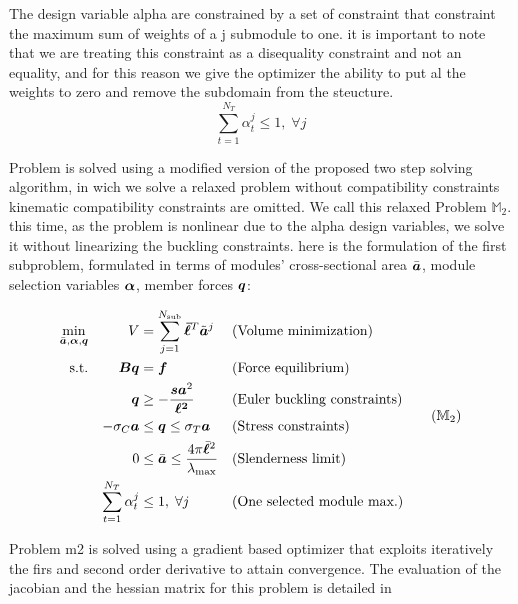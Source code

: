 The design variable alpha are constrained by a set of constraint that constraint the maximum sum of weights of a j submodule to one. it is important to note that we are treating this constraint as a disequality constraint and not an equality, and for this reason we give the optimizer the ability to put al the weights to zero and remove the subdomain from the steucture.
\begin{equation}
    \sum_{t=1}^{N_T} \alpha_t^j \leq 1, \; \forall j 
\end{equation}

Problem  is solved using a modified version of the proposed two step solving algorithm, in wich we solve a relaxed problem without compatibility constraints kinematic compatibility constraints are omitted. We call this relaxed Problem $\mathbb{M}_2$. this time, as the problem is nonlinear due to the alpha design variables, we solve it without linearizing the buckling constraints.  here is the formulation of the first subproblem, formulated in terms of modules' cross-sectional area $\bar{\bm{a}}$, module selection variables $\bm{\alpha}$, member forces $\bm{q}$:

\begin{equation}
    \begin{aligned}
    \min_{\bar{\vect{a}}, \vect{\alpha}, \bm{q}}   && V &= \sum_{j=1}^{N_{\text{sub}}}\vect{\bar{\ell}}^T\tilde{\vect{a}}^j && \textrm{(Volume minimization)}\\
    \textrm{s.t.}   && \bm{B}\bm{q} &= \bm{f} && \textrm{(Force equilibrium)}\\
                    && \bm{q} &\geq -\frac{\bm{s}\bm{a}^2}{\bm{\ell^2}} && \textrm{(Euler buckling constraints)} \\
                    && -\sigma_C\bm{a} &\leq \bm{q} \leq \sigma_T\bm{a} && \textrm{(Stress constraints)} \\
                    && 0 &\leq \bar{\vect{a}} \leq \frac{4 \pi \bar{\vect{\ell}}^2}{\lambda_{\text{max}}} && \textrm{(Slenderness limit)} \\
                    && \sum_{t=1}^{N_T} \alpha_t^j &\leq 1, \; \forall j && \textrm{(One selected module max.)} \\
    \end{aligned}
    \tag{$\mathbb{M}_2$}
    \label{eq:06_optim_relax}
\end{equation}

Problem m2 is solved using a gradient based optimizer that exploits iteratively the firs and second order derivative to attain convergence. The evaluation of the jacobian and the hessian matrix for this problem is detailed in 

